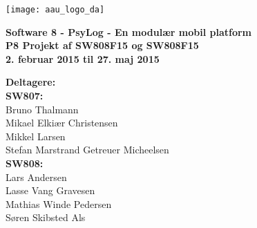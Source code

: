 \hspace*{-1cm}\parbox[b][\textheight][t]{\textwidth}
{

\begin{center}
	\texttt{[image: aau\_logo\_da]}\\
	\vspace{0.25cm}
\end{center} 

\vspace{1cm}
\begin{center}

\textbf{\Huge {Software 8 - PsyLog - En modulær mobil platform}} \\ \vspace{0.5cm}
\textbf{\Large P8 Projekt af SW808F15 og SW808F15}\\ \vspace{0.5cm}
\textbf{\large 2. februar 2015 til 27. maj 2015}\\
\end{center}



\vspace{0.25cm}
\begin{center}
\item {\textbf{Deltagere:}} \\
\textbf{SW807:}\\
Bruno Thalmann\\
Mikael Elkiær Christensen\\
Mikkel Larsen\\
Stefan Marstrand Getreuer Micheelsen\\[0.2cm]
\textbf{SW808:}\\
Lars Andersen\\
Lasse Vang Gravesen\\
Mathias Winde Pedersen\\
Søren Skibsted Als
\end{center}

\thispagestyle{empty}

\newpage
\thispagestyle{empty}
\mbox{}
}